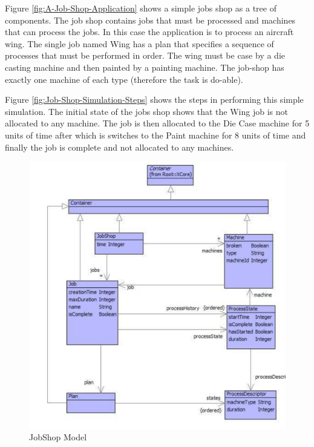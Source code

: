 Figure \ref{fig:A-Job-Shop-Application} shows a simple jobs shop
as a tree of components. The job shop contains jobs that must be processed
and machines that can process the jobs. In this case the application
is to process an aircraft wing. The single job named Wing has a plan
that specifies a sequence of processes that must be performed in order.
The wing must be case by a die casting machine and then painted by
a painting machine. The job-shop has exactly one machine of each type
(therefore the task is do-able).

Figure \ref{fig:Job-Shop-Simulation-Steps} shows the steps in performing
this simple simulation. The initial state of the jobs shop shows that
the Wing job is not allocated to any machine. The job is then allocated
to the Die Case machine for 5 units of time after which is switches
to the Paint machine for 8 units of time and finally the job is complete
and not allocated to any machines.

%
\begin{figure}
\begin{center}

\includegraphics[width=12cm]{Programming/Simulation/Images/JobShop.pdf}

\caption{JobShop Model\label{fig:JobShop-Model}}

\end{center}
\end{figure}


